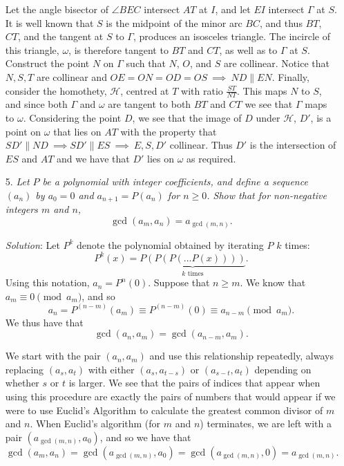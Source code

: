 \documentclass{article}
\begin{document}
\begin{enumerate}
Let the angle bisector of  $\angle BEC$ intersect $AT$ at $I$, and let $EI$ intersect $\Gamma$ at $S$.
It is well known that $S$ is the midpoint of the minor arc $BC$, and thus $BT$, $CT$, and the tangent at $S$ to $\Gamma$, produces an isosceles triangle.
The incircle of this triangle, $\omega$, is therefore tangent to $BT$ and $CT$, as well as to $\Gamma$ at $S$.
Construct the point $N$ on $\Gamma$ such that $N$, $O$, and $S$ are collinear.
Notice that $N,S,T$ are collinear and $OE=ON=OD=OS \ \implies \ ND \parallel EN$.
Finally, consider the homothety, $\mathcal{H}$, centred at $T$ with ratio $\frac{ST}{NT}$.
This maps $N$ to $S$, and since both $\Gamma$ and $\omega$ are tangent to both $BT$ and $CT$ we see that $\Gamma$ maps to $\omega$.
Considering the point $D$, we see that the image of $D$ under $\mathcal{H}$, $D'$, is a point on $\omega$ that lies on $AT$ with the property that $SD' \parallel ND \ \implies SD' \parallel ES \ \implies \ E,S,D'$ collinear.
Thus $D'$ is the intersection of $ES$ and $AT$ and we have that $D'$ lies on $\omega$ as required. 


\item[5.] %
{\itshape
Let $P$ be a polynomial with integer coefficients, and define a sequence $(a_n)$ by $a_0 = 0$ and $a_{n+1} = P(a_n)$ for $n \geq 0$.
Show that for non-negative integers $m$ and $n$,
\[ \gcd(a_m,a_n) = a_{\gcd(m,n)}. \]
}

\textit{Solution}:
Let $P^k$ denote the polynomial obtained by iterating $P$ $k$ times: 
\[
	P^k(x) = \underbrace{P(P(P( \dots P(x))))}_{k \text{ times}}.
\]
Using this notation, $a_n = P^n (0)$.
Suppose that $n \geq m$. We know that $a_m \equiv 0 \pmod{a_m}$, and so
\[
	a_n = P^{(n-m)} (a_m) \equiv P^{(n-m)} (0) \equiv a_{n-m} \pmod{a_m}.
\]
We thus have that
\[
	\gcd(a_n, a_m) = \gcd(a_{n-m}, a_m).
\]

We start with the pair $(a_n, a_m)$ and use this relationship repeatedly, always replacing $(a_s, a_t)$ with either $(a_s, a_{t - s})$ or $(a_{s - t}, a_t)$ depending on whether $s$ or $t$ is larger.
We see that the pairs of indices that appear when using this procedure are exactly the pairs of numbers that would appear if we were to use Euclid's Algorithm to calculate the greatest common divisor of $m$ and $n$.
When Euclid's algorithm (for $m$ and $n$) terminates, we are left with a pair $(a_{\gcd(m, n)}, a_0)$, and so we have that
\[
	\gcd(a_m, a_n) = \gcd(a_{\gcd(m, n)}, a_0) = \gcd(a_{\gcd(m, n)}, 0) = a_{\gcd(m, n)}.
\]


\end{enumerate}
\end{document}
